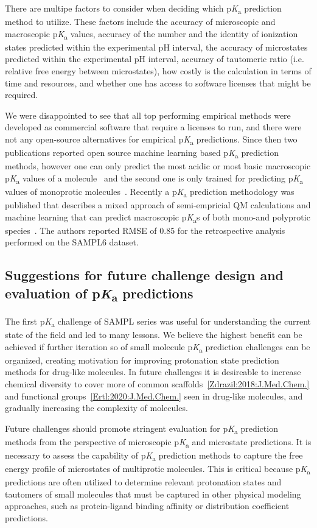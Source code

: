 \documentclass[9pt,lineno,final]{elife}
\newcommand{\pKa}{p\textit{K}\textsubscript{a}}
\begin{document}
There are multipe factors to consider when deciding which \pKa{} prediction method to utilize. These factors include the accuracy of microscopic and macroscopic \pKa{} values, accuracy of the number and the identity of ionization states predicted within the experimental pH interval, the accuracy of microstates predicted within the experimental pH interval, accuracy of tautomeric ratio (i.e. relative free energy between microstates), how costly is the calculation in terms of time and resources, and whether one has access to software licenses that might be required. 

We were disappointed to see that all top performing empirical methods were developed as commercial software that require a licenses to run, and there were not any open-source alternatives for empirical \pKa{} predictions. Since then two publications reported open source machine learning based \pKa{} prediction methods, however one can only predict the most acidic or most basic macroscopic \pKa{} values of a molecule~\citep{Mansouri:2019:J.Cheminformatics} and the second one is only trained for predicting \pKa{} values of monoprotic molecules~\citep{Baltruschat:2020:F1000Research}. Recently a \pKa{} prediction methodology was published that describes a mixed approach of semi-empricial QM calculations and machine learning that can predict macroscopic \pKa{}s of both mono-and polyprotic species~\citep{Hunt:2020:J.Chem.Inf.Model.}. The authors reported RMSE of 0.85 for the retrospective analysis performed on the SAMPL6 dataset.



\subsection{Suggestions for future challenge design and evaluation of \pKa{} predictions}

The first \pKa{} challenge of SAMPL series was useful for understanding the current state of the field and led to many lessons. We believe the highest benefit can be achieved if further iteration so of small molecule \pKa{} prediction challenges can be organized, creating motivation for improving protonation state prediction methods for drug-like molecules. 
In future challenges it is desireable to increase chemical diversity to cover more of common scaffolds~\ref{Zdrazil:2018:J.Med.Chem.} and functional groups~\ref{Ertl:2020:J.Med.Chem.} seen in drug-like molecules, and gradually increasing the complexity of molecules.

Future challenges should promote stringent evaluation for \pKa{} prediction methods from the perspective of microscopic \pKa{} and microstate predictions.
It is necessary to assess the capability of \pKa{} prediction methods to capture the free energy profile of microstates of multiprotic molecules. 
This is critical because \pKa{} predictions are often utilized to determine relevant protonation states and tautomers of small molecules that must be captured in other physical modeling approaches, such as protein-ligand binding affinity or distribution coefficient predictions. 
\end{document}
